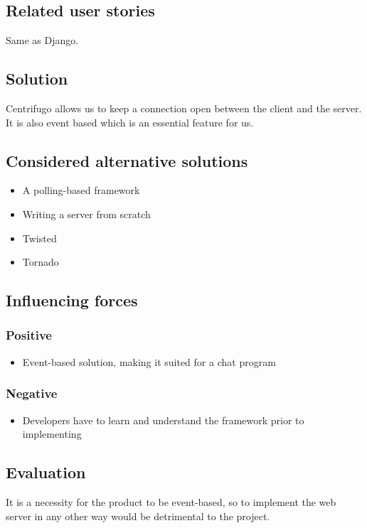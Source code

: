 \documentclass[12pt, a4paper]{article}
\begin{document}
\subsection{Related user stories}
Same as Django.
\subsection{Solution}
Centrifugo allows us to keep a connection open between the client and the server. It is also event based which is an essential feature for us.
\subsection{Considered alternative solutions}
\begin{itemize}
    \item A polling-based framework
    \item Writing a server from scratch
    \item Twisted
    \item Tornado
\end{itemize}
\subsection{Influencing forces}
\begin{minipage}[t]{0.5\textwidth}
    \subsubsection*{Positive}
    \begin{itemize}
        \item Event-based solution, making it suited for a chat program
    \end{itemize}
\end{minipage}%
\begin{minipage}[t]{0.5\textwidth}
    \subsubsection*{Negative}
    \begin{itemize}
        \item Developers have to learn and understand the framework prior to implementing
    \end{itemize}
\end{minipage}
\subsection{Evaluation}
It is a necessity for the product to be event-based, so to implement the web server in any other way would be detrimental to the project.
\end{document}
